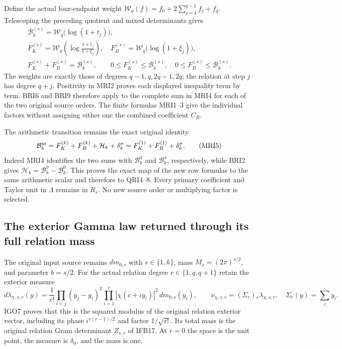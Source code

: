Define the actual four-endpoint weight
$\mathcal W_q(f)=f_0+2\sum_{j=1}^{q-1}f_j+f_q$. Telescoping
the preceding quotient and mixed determinants gives
\[
\begin{gathered}
 \mathcal B_k^{(s)}=\mathcal W_q\bigl(\log(1+t_j)\bigr),\\
 F_K^{(s)}=\mathcal W_q\left(\log\frac{1+t_j}{1+\xi_j}\right),
 \quad F_B^{(s)}=\mathcal W_q\bigl(\log(1+\xi_j)\bigr),\\
 F_K^{(s)}+F_B^{(s)}=\mathcal B_k^{(s)},\qquad
 0\le F_K^{(s)}\le\mathcal B_k^{(s)},\quad
 0\le F_B^{(s)}\le\mathcal B_k^{(s)}.
\end{gathered}\tag{MRI4}
\]
The weights are exactly those of degrees $q-1,q,2q-1,2q$;
the relation at step $j$ has degree $q+j$. Positivity in MRI2
proves each displayed inequality term by term. BRI6 and BRI9
therefore apply to the complete sum in MRI4 for each of the
two original source orders. The finite formulas MRI1--3 give
the individual factors without assigning either one the combined
coefficient $C_B$.

The arithmetic transition remains the exact original identity
\[
 \mathcal B_k^{\rm ar}
   =F_K^{(k)}+F_B^{(k)}+\mathcal H_k+\delta_k^\sigma
   =F_K^{(1)}+F_B^{(1)}+\delta_k^\sigma.
 \tag{MRI5}
\]
Indeed MRI4 identifies the two sums with $\mathcal B_k^0$ and
$\mathcal B_k^\sigma$, respectively, while BRI2 gives
$\mathcal H_k=\mathcal B_k^\sigma-\mathcal B_k^0$.
This proves the exact map of the new row formulas to the same
arithmetic scalar and therefore to QRI4--8. Every primary
coefficient and Taylor unit in $\Lambda$ remains in $R_s$.
No new source order or multiplying factor is selected.

\subsection{The exterior Gamma law returned through its full relation mass}

The original input source remains $dm_{0,s}$ with $s\in\{1,k\}$,
mass $M_s=(2\pi)^{s/2}$, and parameter $b=s/2$. For the actual
relation degree $r\in\{1,q,q+1\}$ retain the exterior measure
\[
 d\lambda_{\chi,s,r}(y)=\frac1{r!}
       \prod_{i<j}(y_j-y_i)^2
       \prod_{i=1}^r|\chi(c+iy_i)|^2\,dm_{0,s}(y_i),
 \qquad \nu_{\chi,s,r}=(\Sigma_r)_*\lambda_{\chi,s,r},
 \quad \Sigma_r(y)=\sum_i y_i.
 \tag{IRI1}
\]
IGO7 proves that this is the squared modulus of the original
relation exterior vector, including its phase
$i^{r(r-1)/2}$ and factor $1/\sqrt{r!}$. Its total mass is the
original relation Gram determinant $Z_{s,r}$ of IFB17. At $r=0$
the space is the unit point, the measure is $\delta_0$, and the
mass is one.

